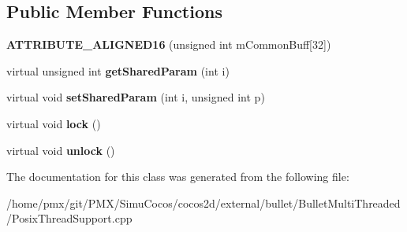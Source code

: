 \subsection*{Public Member Functions}
\begin{DoxyCompactItemize}
\item 
\mbox{\label{classPosixCriticalSection_a138ac0047f4646b7744a4291f5af62e5}} 
{\bfseries A\+T\+T\+R\+I\+B\+U\+T\+E\+\_\+\+A\+L\+I\+G\+N\+E\+D16} (unsigned int m\+Common\+Buff\mbox{[}32\mbox{]})
\item 
\mbox{\label{classPosixCriticalSection_ae27f1cc315798ca0487778b38ca5aa76}} 
virtual unsigned int {\bfseries get\+Shared\+Param} (int i)
\item 
\mbox{\label{classPosixCriticalSection_a4c0eafb1d8cfce392f81872ee16771a4}} 
virtual void {\bfseries set\+Shared\+Param} (int i, unsigned int p)
\item 
\mbox{\label{classPosixCriticalSection_aea6384be1b96f4ec30c23d3c6a781d32}} 
virtual void {\bfseries lock} ()
\item 
\mbox{\label{classPosixCriticalSection_aa1352095de29b845c8f61392663a82e9}} 
virtual void {\bfseries unlock} ()
\end{DoxyCompactItemize}


The documentation for this class was generated from the following file\+:\begin{DoxyCompactItemize}
\item 
/home/pmx/git/\+P\+M\+X/\+Simu\+Cocos/cocos2d/external/bullet/\+Bullet\+Multi\+Threaded/Posix\+Thread\+Support.\+cpp\end{DoxyCompactItemize}
